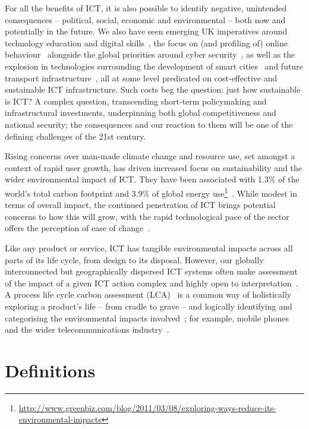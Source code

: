 \documentclass[conference]{IEEEtran}
\begin{document}
For all the benefits of ICT, it is also possible to identify negative,
unintended consequences -- political, social, economic and
environmental -- both now and potentially in the future. We also have
seen emerging UK imperatives around technology education and digital
skills~\cite{brown-et-al-toce2014}, the focus on (and profiling of)
online behaviour~\cite{oatley+crick:2014} alongside the global
priorities around cyber security~\cite{carr+crick-csss2015}, as well
as the explosion in technologies surrounding the development of smart
cities~\cite{cosgrave-et-al:2014} and future transport
infrastructure~\cite{cooper-et-al-sose}, all at some level predicated
on cost-effective and sustainable ICT infrastructure. Such costs beg
the question: just how sustainable is ICT? A complex question,
transcending short-term policymaking and infrastructural investments,
underpinning both global competitiveness and national security; the
consequences and our reaction to them will be one of the defining
challenges of the 21st century.

Rising concerns over man-made climate change and resource use, set
amongst a context of rapid user growth, has driven increased focus on
sustainability and the wider environmental impact of ICT. They have
been associated with 1.3\% of the world's total carbon footprint and
3.9\% of global energy
use\footnote{\url{http://www.greenbiz.com/blog/2011/03/08/exploring-ways-reduce-its-environmental-impacts}}~\cite{plepys:2002}. While
modest in terms of overall impact, the continued penetration of ICT
brings potential concerns to how this will grow, with the rapid
technological pace of the sector offers the perception of ease of
change~\cite{yi+thomas:2007}.

Like any product or service, ICT has tangible environmental impacts
across all parts of its life cycle, from design to its
disposal. However, our globally interconnected but geographically
dispersed ICT systems often make assessment of the impact of a given
ICT action complex and highly open to
interpretation~\cite{andrae+andersen:2010}. A process life cycle
carbon assessment
(LCA)~\cite{baumann+tillman:2004,iso14040:2006,bsi2050:2011} is a
common way of holistically exploring a product’s life -- from cradle
to grave -- and logically identifying and categorising the
environmental impacts involved~\cite{malmodin-et-al:2014}; for
example, mobile phones~\cite{frey-et-al:2008,fehske:2011} and the
wider telecommunications industry~\cite{scharnhorst:2008}.

\section{Definitions}
\end{document}
